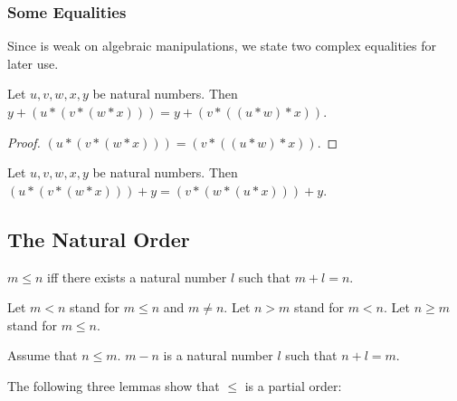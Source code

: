 \documentclass[english,11pt]{article}
\begin{document}
\subsubsection{Some Equalities}

Since \Naproche{} is weak on algebraic manipulations, we 
state two complex equalities for later use.

\begin{forthel}

\begin{lemma}
Let $u,v,w,x,y$ be natural numbers. 
Then $y + (u * (v * (w * x))) = y + (v * ((u * w) * x))$.
\end{lemma}
\begin{proof}
$(u * (v * (w * x))) = (v * ((u * w) * x))$.
\end{proof}

\begin{lemma}
Let $u,v,w,x,y$ be natural numbers. Then  $(u * (v * (w * x))) + y = (v * (w * (u * x))) + y$.
\end{lemma}


\end{forthel}


\subsection{The Natural Order}

\begin{forthel}

\begin{definition}
$m \leq n$ iff
there exists a natural number $l$ such that $m + l = n$.
\end{definition}

Let $m < n$ stand for $m \leq n$ and $m \neq n$.
Let $n > m$ stand for $m < n$.
Let $n \geq m$ stand for $m \leq n$.


\begin{definition}
Assume that $n \leq m$.
$m - n$ is a natural number $l$ such that $n + l  = m$.
\end{definition}

\end{forthel}

The following three lemmas show that $\leq$ is a partial order:
\end{document}
